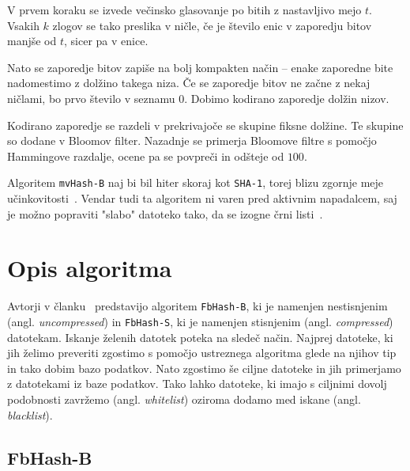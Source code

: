 \documentclass{acm_proc_article-sp}
\begin{document}
V prvem koraku se izvede večinsko glasovanje po bitih z nastavljivo mejo $t$. Vsakih $k$ zlogov se tako preslika v ničle, če je število enic v zaporedju bitov manjše od $t$, sicer pa v enice.

Nato se zaporedje bitov zapiše na bolj kompakten način -- enake zaporedne bite nadomestimo z dolžino takega niza. Če se zaporedje bitov ne začne z nekaj ničlami, bo prvo število v seznamu 0. Dobimo kodirano zaporedje dolžin nizov.

Kodirano zaporedje se razdeli v prekrivajoče se skupine fiksne dolžine. Te skupine so dodane v Bloomov filter.
Nazadnje se primerja Bloomove filtre s pomočjo Hammingove razdalje, ocene pa se povpreči in odšteje od $100$. 

Algoritem \texttt{mvHash-B} naj bi bil hiter skoraj kot \texttt{SHA-1}, torej blizu zgornje meje učinkovitosti~\cite{mvhash-b}. Vendar tudi ta algoritem ni varen pred aktivnim napadalcem, saj je možno popraviti "slabo" datoteko tako, da se izogne črni listi~\cite{chang2016security}.

\section{Opis algoritma}

Avtorji v članku~\cite{fbhash} predstavijo algoritem \texttt{FbHash-B}, ki je namenjen nestisnjenim (angl. \emph{uncompressed}) in \texttt{FbHash-S}, ki je namenjen stisnjenim (angl. \emph{compressed}) datotekam. Iskanje želenih datotek poteka na sledeč način. Najprej datoteke, ki jih želimo preveriti zgostimo s pomočjo ustreznega algoritma glede na njihov tip in tako dobim bazo podatkov. Nato zgostimo še ciljne datoteke in jih primerjamo z datotekami iz baze podatkov. Tako lahko datoteke, ki imajo s ciljnimi dovolj podobnosti zavržemo (angl. \emph{whitelist}) oziroma dodamo med iskane (angl. \emph{blacklist}).

\subsection{FbHash-B}
\end{document}
